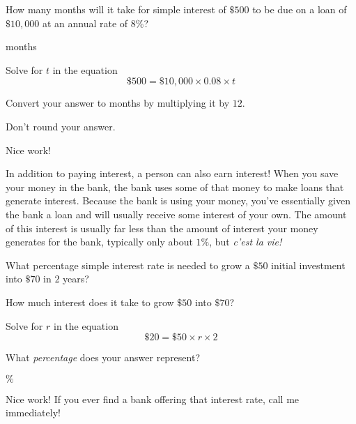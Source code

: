 \documentclass{ximera}
\begin{document}
\begin{question}
How many months will it take for simple interest of $\$500$ to be due on a loan of $\$10,000$ at an annual rate of $8\%$? 	

\begin{solution}
 months
\begin{hint}
Solve for $t$ in the equation
\begin{equation*}\$500=\$10,000\times 0.08\times t\end{equation*}
\end{hint}
\begin{hint}
Convert your answer to months by multiplying it by $12$.
\end{hint}
\begin{hint}
Don't round your answer.
\end{hint}
\end{solution}	

Nice work!
\end{question}

In addition to paying interest, a person can also earn interest! When you save your money in the bank, the bank uses some of that money to make loans that generate interest. Because the bank is using your money, you've essentially given the bank a loan and will usually receive some interest of your own. The amount of this interest is usually far less than the amount of interest your money generates for the bank, typically only about $1\%$, but \emph{c'est la vie!}

\begin{question}
What percentage simple interest rate is needed to grow a $\$50$ initial investment into $\$70$ in $2$ years?

\begin{solution}
\begin{hint}
How much interest does it take to grow $\$50$ into $\$70$?
\end{hint}
\begin{hint}
Solve for $r$ in the equation
\begin{equation*}\$20=\$50\times r\times 2\end{equation*}
\end{hint}
\begin{hint}
What \emph{percentage} does your answer represent?
\end{hint}
$\%$
\end{solution}	

Nice work! If you ever find a bank offering that interest rate, call me immediately!
\end{question}
\end{document}
